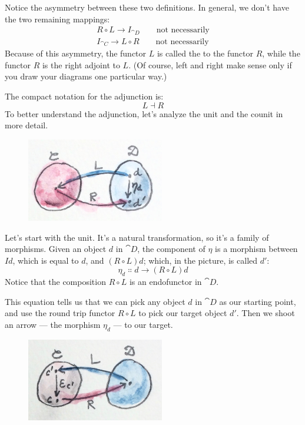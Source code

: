Notice the asymmetry between these two definitions. In general, we don't
have the two remaining mappings:
\begin{gather*}
R \circ L \to I_{\cat{D}} \quad\quad\text{not necessarily} \\
I_{\cat{C}} \to L \circ R \quad\quad\text{not necessarily}
\end{gather*}
Because of this asymmetry, the functor $L$ is called the
 to the functor $R$, while the functor
$R$ is the right adjoint to $L$. (Of course, left and
right make sense only if you draw your diagrams one particular way.)

The compact notation for the adjunction is:
\[L \dashv R\]
To better understand the adjunction, let's analyze the unit and the
counit in more detail.

\begin{figure}[H]
\centering
\includegraphics[width=60mm]{images/adj-unit.jpg}
\end{figure}

\noindent
Let's start with the unit. It's a natural transformation, so it's a
family of morphisms. Given an object $d$ in $\cat{D}$, the
component of $\eta$ is a morphism between $I d$, which is equal to
$d$, and $(R \circ L) d$; which, in the picture, is called
$d'$:
\[\eta_d \Colon d \to (R \circ L) d\]
Notice that the composition $R \circ L$ is an endofunctor in $\cat{D}$.

This equation tells us that we can pick any object $d$ in
$\cat{D}$ as our starting point, and use the round trip functor
$R \circ L$ to pick our target object $d'$. Then we
shoot an arrow --- the morphism $\eta_d$ --- to our target.

\begin{figure}[H]
\centering
\includegraphics[width=60mm]{images/adj-counit.jpg}
\end{figure}

